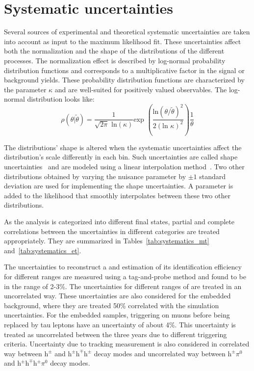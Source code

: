 \section{Systematic uncertainties}

Several sources of experimental and theoretical systematic uncertainties are taken into account as input to the maximum likelihood fit. These uncertainties affect both the normalization and the shape of the distributions of the different processes. The normalization effect is described by log-normal probability distribution functions and corresponds to a multiplicative factor in the signal or background yields. These probability distribution functions are characterized by the parameter $\kappa$ and are well-suited for positively valued observables. The log-normal distribution looks like:
\begin{equation}
\rho(\theta|\tilde{\theta})=\frac{1}{\sqrt{2\pi}\text{ ln}(\kappa)}\text{exp }(\frac{\text{ln}(\theta/\tilde{\theta})^2}{2(\text{ln }\kappa)^2}) \frac{1}{\theta}
\end{equation}

The distributions' shape is altered when the systematic uncertainties affect the distribution's scale differently in each bin. Such uncertainties are called shape uncertainties~\cite{Conway:2011in} and are modeled using a linear interpolation method~\cite{Read:1999kh}. Two other distributions obtained by varying the nuisance parameter by $\pm 1$ standard deviation are used for implementing the shape uncertainties. A parameter is added to the likelihood that smoothly interpolates between these two other distributions.

As the analysis is categorized into different final states, partial and complete correlations between the uncertainties in different categories are treated appropriately. They are summarized in Tables~\ref{tab:systematics_mt} and~\ref{tab:systematics_et}.




The uncertainties to reconstruct a \tauh and estimation of its identification efficiency for different \pt ranges are measured using a tag-and-probe method and found to be in the range of 2-3\%. The uncertainties for different ranges of \pt are treated in an uncorrelated way. These uncertainties are also considered for the embedded \Pgt{}\Pgt background, where they are treated 50\% correlated with the simulation uncertainties. For the embedded samples, triggering on muons before being replaced by tau leptons have an uncertainty of about 4\%. This uncertainty is treated as uncorrelated between the three years due to different triggering criteria. Uncertainty due to tracking measurement is also considered in correlated way between $\text{h}^{\pm}$ and $\text{h}^{\pm}\text{h}^{\mp}\text{h}^{\pm}$ decay modes and uncorrelated way between $\text{h}^{\pm}\pi^{0}$ and $\text{h}^{\pm}\text{h}^{\mp}\text{h}^{\pm}\pi^{0}$ decay modes.

